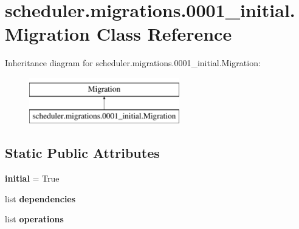 \hypertarget{classscheduler_1_1migrations_1_10001__initial_1_1_migration}{\section{scheduler.\-migrations.0001\-\_\-initial.Migration Class Reference}
\label{classscheduler_1_1migrations_1_10001__initial_1_1_migration}
}
Inheritance diagram for scheduler.\-migrations.0001\-\_\-initial.Migration\-:\begin{figure}[H]
\begin{center}
\leavevmode
\includegraphics[height=2.000000cm]{classscheduler_1_1migrations_1_10001__initial_1_1_migration}
\end{center}
\end{figure}
\subsection*{Static Public Attributes}
\begin{DoxyCompactItemize}
\item 
\hypertarget{classscheduler_1_1migrations_1_10001__initial_1_1_migration_ae9fa974c12a7662b1a912aa3a1fcabc7}{{\bfseries initial} = True}\label{classscheduler_1_1migrations_1_10001__initial_1_1_migration_ae9fa974c12a7662b1a912aa3a1fcabc7}

\item 
list {\bfseries dependencies}
\item 
\hypertarget{classscheduler_1_1migrations_1_10001__initial_1_1_migration_a770d37ba1e0a9cb6ea5164be5c780e59}{list {\bfseries operations}}\label{classscheduler_1_1migrations_1_10001__initial_1_1_migration_a770d37ba1e0a9cb6ea5164be5c780e59}

\end{DoxyCompactItemize}


